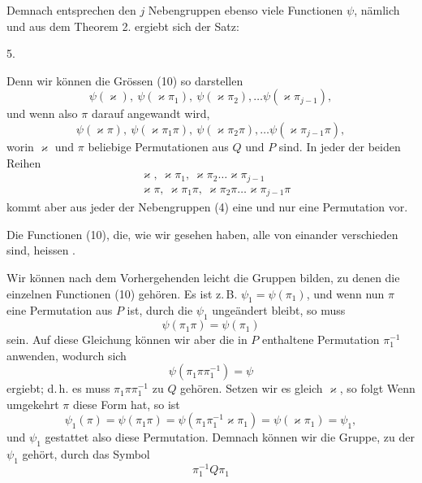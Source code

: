 

Demnach entsprechen den $j$ Nebengruppen ebenso viele Functionen $\psi$, nämlich
und aus dem Theorem 2. ergiebt sich der Satz:

5. 

Denn wir können die Grössen (10) so darstellen
\[
\psi(\varkappa),\ \psi(\varkappa\pi_1),\ \psi(\varkappa\pi_2),\ldots \psi(\varkappa\pi_{j-1}),
\]
und wenn also $\pi$ darauf angewandt wird,
\[
\psi(\varkappa\pi),\ \psi(\varkappa\pi_1\pi),\ \psi(\varkappa\pi_2\pi),\ldots \psi(\varkappa\pi_{j-1}\pi),
\]
worin $\varkappa$ und $\pi$ beliebige Permutationen aus $Q$ und $P$ sind. In jeder der beiden Reihen
\[
\begin{aligned}
&\varkappa,\ \varkappa\pi_1,\ \varkappa\pi_2\ldots\varkappa\pi_{j-1}\\
&\varkappa\pi,\ \varkappa\pi_1\pi,\ \varkappa\pi_2\pi\ldots\varkappa\pi_{j-1}\pi
\end{aligned}
\]
kommt aber aus jeder der Nebengruppen (4) eine und nur eine Permutation vor.

Die Functionen (10), die, wie wir gesehen haben, alle von einander verschieden sind, heissen .

Wir können nach dem Vorhergehenden leicht die Gruppen bilden, zu denen die einzelnen Functionen (10) gehören. Es ist z.\,B. $\psi_1 = \psi(\pi_1)$, und wenn nun $\pi$ eine Permutation aus $P$ ist, durch die $\psi_1$ ungeändert bleibt, so muss
\[
\psi(\pi_1\pi) = \psi(\pi_1)
\]
sein. Auf diese Gleichung können wir aber die in $P$ enthaltene Permutation $\pi_1^{-1}$ anwenden, wodurch sich
\[
\psi(\pi_1\pi\pi_1^{-1}) = \psi
\]
ergiebt; d.\,h. es muss $\pi_1\pi\pi_1^{-1}$ zu $Q$ gehören. Setzen wir es gleich $\varkappa$, so folgt
Wenn umgekehrt $\pi$ diese Form hat, so ist
\[
\psi_1(\pi) = \psi(\pi_1\pi) = \psi(\pi_1\pi_1^{-1}\varkappa\pi_1) = \psi(\varkappa\pi_1) = \psi_1,
\]
und $\psi_1$ gestattet also diese Permutation. Demnach können wir die Gruppe, zu der $\psi_1$ gehört, durch das Symbol
\[
\pi_1^{-1}Q\pi_1
\]
